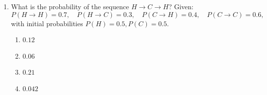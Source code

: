 \documentclass[12pt]{article}
\begin{document}
\begin{enumerate}[label=Q\arabic*.]
 \begin{enumerate}[label=(\Alph*)]
     \item To enable the model to process text as numerical input based on a fixed vocabulary mapping
     \item To ensure every word has a single unchanging meaning
     \item To compress the sentence into a shorter representation
     \item To remove grammatical ambiguity before training
 \end{enumerate}
 
 \item What is the probability of the sequence $H \rightarrow C \rightarrow H$? Given:
 \[
 P(H \rightarrow H) = 0.7,\quad
 P(H \rightarrow C) = 0.3,\quad
 P(C \rightarrow H) = 0.4,\quad
 P(C \rightarrow C) = 0.6,
 \]
 with initial probabilities \(P(H) = 0.5, P(C) = 0.5\).
 \begin{enumerate}[label=(\Alph*)]
     \item $0.12$
     \item $0.06$
     \item $0.21$
     \item $0.042$
 \end{enumerate}
 

\end{enumerate}
\end{document}
